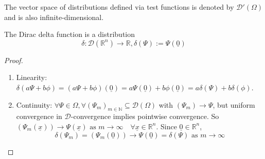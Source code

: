 \begin{definition}
	The vector space of distributions defined via test functions is denoted by $\mathcal{D}'(\Omega)$ and is also infinite-dimensional.
\end{definition}

\begin{example}
	The Dirac delta function is a distribution
	\[
		\delta: \mathcal{D}(\mathbb{R}^n) \rightarrow \mathbb{R}, \delta(\Psi) := \Psi(\underline{0})
	\]
\end{example}

\begin{proof}
	\hfill
	\begin{enumerate}
		\item Linearity: $\delta(a \Psi + b \phi) = (a \Psi + b \phi) (\underline{0}) = a \Psi(\underline{0}) + b \phi(\underline{0}) = a \delta (\Psi) + b \delta(\phi)$.
		\item Continuity: $\forall \Psi \in \mathcal{\Omega}, \forall {(\Psi_m)}_{m \in \mathbb{N}} \subseteq \mathcal{D}(\Omega)$ with $(\Psi_m) \rightarrow \Psi$, but uniform convergence in $\mathcal{D}$-convergence implies pointwise convergence. So $(\Psi_m(\underline{x})) \rightarrow \Psi(\underline{x}) \text{ as } m \rightarrow \infty \quad \forall \underline{x} \in \mathbb{R}^n$. Since $\underline{0} \in \mathbb{R}^n$,
		\[
			\delta(\Psi_m) = (\Psi_m (\underline{0})) \rightarrow \Psi (\underline{0}) = \delta (\Psi) \text{ as } m \rightarrow \infty
		\]
	\end{enumerate}
\end{proof}

